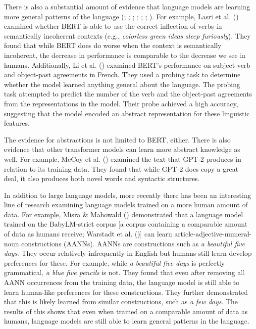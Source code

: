 \documentclass[
  12pt,
  letterpaper,
]{scrreport}
\begin{document}
There is also a substantial amount of evidence that language models are
learning more general patterns of the language
(;
;
;
;
;
; ). For example, Lasri et al.
() examined whether
BERT is able to use the correct inflection of verbs in semantically
incoherent contexts (e.g., \emph{colorless green ideas sleep
furiously}). They found that while BERT does do worse when the context
is semantically incoherent, the decrease in performance is comparable to
the decrease we see in humans. Additionally, Li et al.
() examined
BERT's performance on subject-verb and object-past agreements in French.
They used a probing task to determine whether the model learned anything
general about the language. The probing task attempted to predict the
number of the verb and the object-past agreements from the
representations in the model. Their probe achieved a high accuracy,
suggesting that the model encoded an abstract representation for these
linguistic features.

The evidence for abstractions is not limited to BERT, either. There is
also evidence that other transformer models can learn more abstract
knowledge as well. For example, McCoy et al.
() examined the text that
GPT-2 produces in relation to its training data. They found that while
GPT-2 does copy a great deal, it also produces both novel words and
syntactic structures.

In addition to large language models, more recently there has been an
interesting line of research examining language models trained on a more
human amount of data. For example, Misra \& Mahowald
() demonstrated that a
language model trained on the BabyLM-strict corpus {[}a corpus
containing a comparable amount of data as humans receive; Warstadt et
al. (){]} can
learn article-adjective-numeral-noun constructions (AANNs). AANNs are
constructions such as \emph{a beautiful five days}. They occur
relatively infrequently in English but humans still learn develop
preferences for these. For example, while \emph{a beautiful five days}
is perfectly grammatical, \emph{a blue five pencils} is not. They found
that even after removing all AANN occurrences from the training data,
the language model is still able to learn human-like preferences for
these constructions. They further demonstrated that this is likely
learned from similar constructions, such as \emph{a few days}. The
results of this shows that even when trained on a comparable amount of
data as humans, language models are still able to learn general patterns
in the language.
\end{document}

